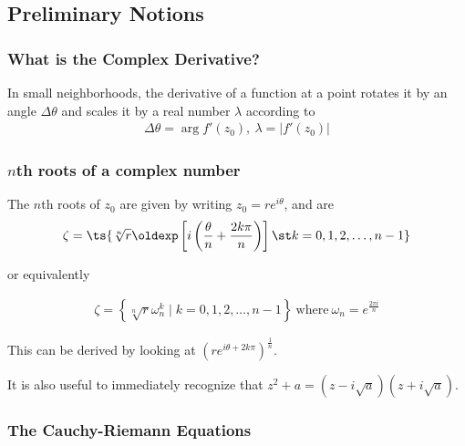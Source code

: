 \hypertarget{preliminary-notions}{%
\subsection{Preliminary Notions}\label{preliminary-notions}}

\hypertarget{what-is-the-complex-derivative}{%
\subsubsection{What is the Complex
Derivative?}\label{what-is-the-complex-derivative}}

In small neighborhoods, the derivative of a function at a point rotates
it by an angle \(\Delta\theta\) and scales it by a real number
\(\lambda\) according to
\begin{align*}\Delta\theta = \arg f'(z_0), ~\lambda = |f'(z_0)|\end{align*}

\hypertarget{nth-roots-of-a-complex-number}{%
\subsubsection{\texorpdfstring{\(n\)th roots of a complex
number}{nth roots of a complex number}}\label{nth-roots-of-a-complex-number}}

The \(n\)th roots of \(z_0\) are given by writing
\(z_0 = re^{i\theta}\), and are
\begin{align*}
\zeta = \ts{ \sqrt[n]{r} \oldexp\left[{i\left( \frac{\theta}{n} + \frac{2k\pi}{n}\right)}\right] \st k = 0,1,2, \ldots, n-1 }
\end{align*}

or equivalently

\begin{align*}\zeta = \left\{ \sqrt[n]{r}\omega_n^k \mid k = 0,1,2,\ldots, n-1\right\}~\text{where}~\omega_n = e^{\frac{2\pi i}{n}}\end{align*}

This can be derived by looking at
\(\left( re^{i\theta + 2k\pi}\right)^{\frac{1}{n}}\).

It is also useful to immediately recognize that
\(z^2+a = (z-i\sqrt{a})(z+i\sqrt{a})\).

\hypertarget{the-cauchy-riemann-equations}{%
\subsubsection{The Cauchy-Riemann
Equations}\label{the-cauchy-riemann-equations}}


